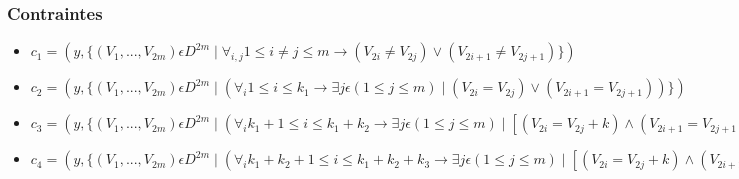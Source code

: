 \documentclass[a4paper,11pt]{article}
\begin{document}
\subsubsection{Contraintes}
\begin{itemize}
\item $ c_{1} = ( y, \{ (V_{1}, ..., V_{2m}) \epsilon  D^{2m} \mid \forall_{i,j} 1\leq i \neq j \leq m \rightarrow (V_{2i} \neq V_{2j}) \vee  (V_{2i+1} \neq V_{2j+1}) \} ) $

\item $ c_{2} = ( y, \{ (V_{1}, ..., V_{2m}) \epsilon  D^{2m} \mid (\forall_{i} 1\leq i \leq k_{1} \rightarrow \exists j \epsilon (1 \leq j \leq m) \mid (V_{2i} = V_{2j}) \vee  (V_{2i+1} = V_{2j+1}) )\} ) $

\item $ c_{3} = ( y, \{ (V_{1}, ..., V_{2m}) \epsilon  D^{2m} \mid (\forall_{i} k_{1}+1\leq i \leq k_{1}+k_{2} \rightarrow \exists j \epsilon (1 \leq j \leq m) \mid [ (V_{2i} = V_{2j}+k) \wedge  (V_{2i+1} = V_{2j+1}+k) \vee  (V_{2i} = V_{2j}-k) \wedge  (V_{2i+1} = V_{2j+1}+k) ]), k \epsilon \mathbb{Z}_{0} \} ) $

\item $ c_{4} = ( y, \{ (V_{1}, ..., V_{2m}) \epsilon  D^{2m} \mid (\forall_{i} k_{1}+k_{2}+1\leq i \leq k_{1}+k_{2}+k_{3} \rightarrow \exists j \epsilon (1 \leq j \leq m) \mid [ (V_{2i} = V_{2j}+k) \wedge  (V_{2i+1} = V_{2j+1}+l) \vee  (V_{2i} = V_{2j}+l) \wedge  (V_{2i+1} = V_{2j+1}+k) ]), k \epsilon \{-2, 2\}, l \epsilon \{-1, 1\} \} ) $

\end{itemize}
\end{document}
